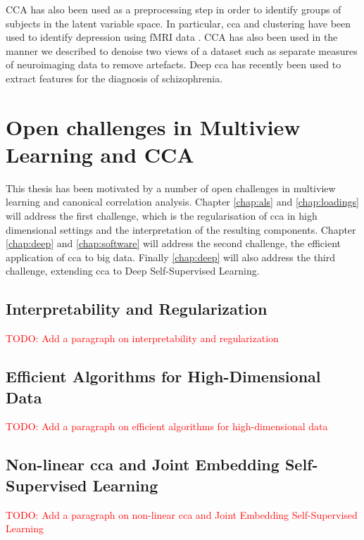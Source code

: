 CCA has also been used as a preprocessing step in order to identify groups of subjects in the latent variable space.
In particular, \acrshort{cca} and clustering have been used to identify depression using fMRI data \citep{dinga2019evaluating,drysdale2017resting}.
CCA has also been used in the manner we described to denoise two \gls{views} of a dataset such as separate measures of neuroimaging data \citep{zhuang2020technical} to remove artefacts.
Deep \acrshort{cca} has recently been used to extract features for the diagnosis of schizophrenia\citep{qi2016deep}.


\section{Open challenges in Multiview Learning and CCA}

This thesis has been motivated by a number of open challenges in multiview learning and canonical correlation analysis.
Chapter \ref{chap:als} and \ref{chap:loadings} will address the first challenge, which is the regularisation of \acrshort{cca} in high dimensional settings and the interpretation of the resulting components.
Chapter \ref{chap:deep} and \ref{chap:software} will address the second challenge, the efficient application of \acrshort{cca} to big data.
Finally \ref{chap:deep} will also address the third challenge, extending \acrshort{cca} to Deep Self-Supervised Learning.

\subsection{Interpretability and Regularization}

\textcolor{red}{TODO: Add a paragraph on interpretability and regularization}

\subsection{Efficient Algorithms for High-Dimensional Data}

\textcolor{red}{TODO: Add a paragraph on efficient algorithms for high-dimensional data}

\subsection{Non-linear \acrshort{cca} and Joint Embedding Self-Supervised Learning}

\textcolor{red}{TODO: Add a paragraph on non-linear \acrshort{cca} and Joint Embedding Self-Supervised Learning}

